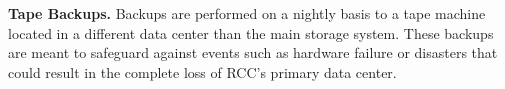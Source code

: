 

 \textbf{Tape Backups.} Backups are performed on a nightly basis to a tape machine located in a different data center than the main storage system. These backups are meant to safeguard against events such as hardware failure or disasters that could result in the complete loss of RCC’s primary data center.


